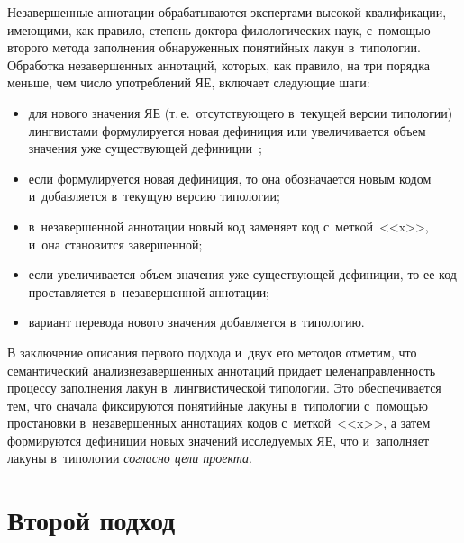 \begin{multicols}{2}
  Незавершенные аннотации обрабатываются экспертами высокой 
квалификации, имеющими, как правило, степень доктора филологических 
наук, с~помощью второго метода заполнения обнаруженных понятийных 
лакун в~типологии. Обработка незавершенных аннотаций, которых, как 
правило, на три порядка меньше, чем число употреблений ЯЕ, включает 
следующие шаги:
  \begin{itemize}
\item для нового значения ЯЕ (т.\,е.\ отсутствующего в~текущей версии 
типологии) лингвистами формулируется новая дефиниция или увеличивается 
объем значения уже существующей дефиниции~\cite{16-z};\\[-13pt]
\item если формулируется новая дефиниция, то она обозначается новым 
кодом и~добавляется в~текущую версию типологии;\\[-13pt]
\item в~незавершенной аннотации новый код заменяет код с~меткой~<<x>>, 
и~она становится завершенной;\\[-13pt]
\item если увеличивается объем значения уже существующей дефиниции, то 
ее код проставляется в~незавершенной аннотации;\\[-13pt]
\item вариант перевода нового значения добавляется в~типологию.
\end{itemize}

  В заключение описания первого подхода и~двух его методов отметим, что 
семантический анализ\linebreak незавершенных аннотаций придает 
це\-ле\-на\-прав\-лен\-ность процессу заполнения лакун в~лингвистической 
типологии. Это обеспечивается тем, что сначала фиксируются понятийные 
лакуны в~типологии с~помощью простановки в~незавершенных аннотациях 
кодов с~меткой~<<x>>, а затем формируются дефиниции новых значений 
исследуемых ЯЕ, что и~заполняет лакуны в~типологии \textit{согласно цели 
проекта}.

\vspace*{-6pt}
  
\section{Второй подход}

\vspace*{-2pt}


\end{multicols}
